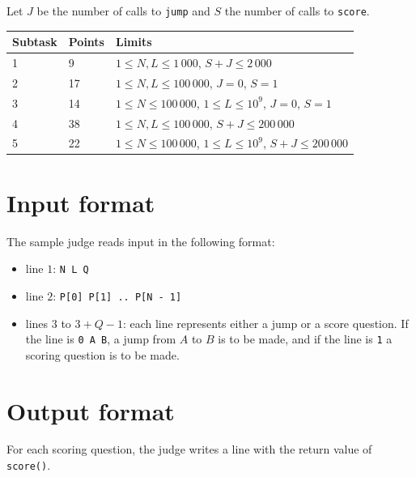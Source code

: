Let $J$ be the number of calls to \texttt{jump} and $S$ the number of calls to \texttt{score}.

\begin{tabular}{|l|l|l|}
  \hline
  \textbf{Subtask} & \textbf{Points} & \textbf{Limits} \\ \hline
  1 & 9 & $1 \le N, L \le 1\,000$,  $S + J \le 2\,000$ \\ \hline
  2 & 17 & $1 \le N, L \le 100\,000$, $J = 0$, $S = 1$ \\ \hline
  3 & 14 & $1 \le N \le 100\,000$, $1 \le L \le 10^9$, $J = 0$, $S = 1$ \\ \hline
  4 & 38 & $1 \le N, L \le 100\,000$, $S + J \le 200\,000$ \\ \hline
  5 & 22 & $1 \le N \le 100\,000$, $1 \le L \le 10^9$, $S + J \le 200\,000$ \\ \hline
\end{tabular}

\section*{Input format}
The sample judge reads input in the following format:

\begin{itemize}
  \item line $1$: \texttt{N L Q}
  \item line $2$: \texttt{P[0] P[1] .. P[N - 1]}
  \item lines $3$ to $3 + Q - 1$: each line represents either a jump or a score question.
    If the line is \texttt{0 A B}, a jump from $A$ to $B$ is to be made, and if the line is \texttt{1} a scoring question is to be made.
\end{itemize}

\section*{Output format}
For each scoring question, the judge writes a line with the return value of \texttt{score()}.
